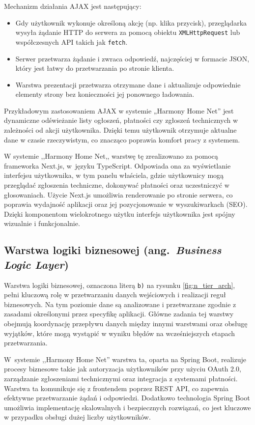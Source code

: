 Mechanizm działania AJAX jest następujący:
\begin{itemize}
    \item Gdy użytkownik wykonuje określoną akcję (np. klika przycisk), przeglądarka wysyła żądanie HTTP do serwera za pomocą obiektu \texttt{XMLHttpRequest} lub współczesnych API takich jak \texttt{fetch}.
    \item Serwer przetwarza żądanie i zwraca odpowiedź, najczęściej w formacie JSON, który jest łatwy do przetwarzania po stronie klienta.
    \item Warstwa prezentacji przetwarza otrzymane dane i aktualizuje odpowiednie elementy strony bez konieczności jej ponownego ładowania.
\end{itemize}

Przykładowym zastosowaniem AJAX w systemie „Harmony Home Net” jest dynamiczne odświeżanie listy ogłoszeń, płatności czy zgłoszeń technicznych w zależności od akcji użytkownika. Dzięki temu użytkownik otrzymuje aktualne dane w czasie rzeczywistym, co znacząco poprawia komfort pracy z systemem.


W systemie ,,Harmony Home Net,, warstwę tę zrealizowano za pomocą frameworka Next.js, w~języku TypeScript. Odpowiada ona za wyświetlanie interfejsu użytkownika, w tym panelu właściela, gdzie użytkownicy mogą przeglądać zgłoszenia techniczne, dokonywać płatności oraz uczestniczyć w głosowaniach. Użycie Next.js umożliwia renderowanie po stronie serwera, co poprawia wydajność aplikacji oraz jej pozycjonowanie w wyszukiwarkach (SEO). Dzięki komponentom wielokrotnego użytku interfejs użytkownika jest spójny wizualnie i funkcjonalnie. 

\subsection{Warstwa logiki biznesowej (ang.\ \emph{Business Logic Layer})}

Warstwa logiki biznesowej, oznaczona  literą \texttt{b)} na rysunku \ref{fig:n_tier_arch}, pełni kluczową rolę w przetwarzaniu danych wejściowych i realizacji reguł biznesowych. Na tym poziomie dane są analizowane i przetwarzane zgodnie z zasadami określonymi przez specyfikę aplikacji. Główne zadania tej warstwy obejmują koordynację przepływu danych między innymi warstwami oraz obsługę wyjątków, które mogą wystąpić w wyniku błędów na wcześniejszych etapach przetwarzania.

W~systemie ,,Harmony Home Net'' warstwa ta, oparta na Spring Boot, realizuje procesy biznesowe takie jak autoryzacja użytkowników przy użyciu OAuth 2.0, zarządzanie zgłoszeniami technicznymi oraz integracja z systemami płatności. Warstwa ta komunikuje się z frontendem poprzez REST API, co zapewnia efektywne przetwarzanie żądań i odpowiedzi. Dodatkowo technologia Spring Boot umożliwia implementację skalowalnych i bezpiecznych rozwiązań, co jest kluczowe w przypadku obsługi dużej liczby użytkowników.

